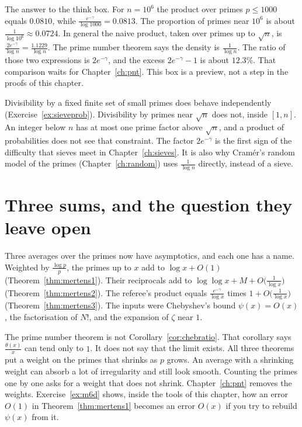 \begin{beauty}
The answer to the think box. For $n=10^6$ the product over primes $p\le 1000$ equals $0.0810$, while $\frac{e^{-\gamma}}{\log 1000}=0.0813$. The proportion of primes near $10^6$ is about $\frac1{\log 10^6}\approx 0.0724$. In general the naive product, taken over primes up to $\sqrt n$, is $\frac{2e^{-\gamma}}{\log n}=\frac{1.1229}{\log n}$. The prime number theorem says the density is $\frac1{\log n}$. The ratio of those two expressions is $2e^{-\gamma}$, and the excess $2e^{-\gamma}-1$ is about $12.3\%$. That comparison waits for Chapter~\ref{ch:pnt}. This box is a preview, not a step in the proofs of this chapter.

Divisibility by a fixed finite set of small primes does behave independently (Exercise~\ref{ex:sieveprob}). Divisibility by primes near $\sqrt n$ does not, inside $[1,n]$. An integer below $n$ has at most one prime factor above $\sqrt n$, and a product of probabilities does not see that constraint. The factor $2e^{-\gamma}$ is the first sign of the difficulty that sieves meet in Chapter~\ref{ch:sieves}. It is also why Cram\'er's random model of the primes (Chapter~\ref{ch:random}) uses $\frac1{\log n}$ directly, instead of a sieve.
\end{beauty}

\section{Three sums, and the question they leave open}

Three averages over the primes now have asymptotics, and each one has a name. Weighted by $\frac{\log p}p$, the primes up to $x$ add to $\log x+O(1)$ (Theorem~\ref{thm:mertens1}). Their reciprocals add to $\log\log x+M+O\bigl(\frac1{\log x}\bigr)$ (Theorem~\ref{thm:mertens2}). The referee's product equals $\frac{e^{-\gamma}}{\log x}$ times $1+O\bigl(\frac1{\log x}\bigr)$ (Theorem~\ref{thm:mertens3}). The inputs were Chebyshev's bound $\psi(x)=O(x)$, the factorisation of $N!$, and the expansion of $\zeta$ near $1$.

The prime number theorem is not Corollary~\ref{cor:chebratio}. That corollary says $\frac{\theta(x)}x$ can tend only to $1$. It does not say that the limit exists. All three theorems put a weight on the primes that shrinks as $p$ grows. An average with a shrinking weight can absorb a lot of irregularity and still look smooth. Counting the primes one by one asks for a weight that does not shrink. Chapter~\ref{ch:pnt} removes the weights. Exercise~\ref{ex:m6d} shows, inside the tools of this chapter, how an error $O(1)$ in Theorem~\ref{thm:mertens1} becomes an error $O(x)$ if you try to rebuild $\psi(x)$ from it.

